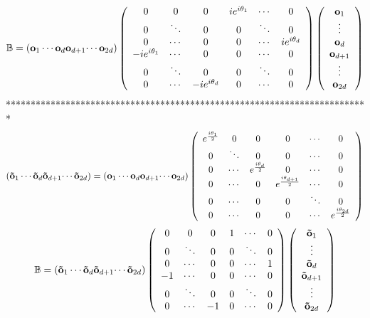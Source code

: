 \documentclass[aps,preprint]{revtex4}%
\begin{document}
\[
\mathbb{B}=\left(  \mathbf{o}_{1}\cdots\mathbf{o}_{d}\mathbf{o}_{d+1}%
\mathbf{\cdots o}_{2d}\right)  \left(
\begin{array}
[c]{cccccc}%
0 & 0 & 0 & ie^{i\theta_{1}} & \cdots & 0\\
0 & \ddots & 0 & 0 & \ddots & 0\\
0 & \cdots & 0 & 0 & \cdots & ie^{i\theta_{d}}\\
-ie^{i\theta_{1}} & \cdots & 0 & 0 & \cdots & 0\\
0 & \ddots & 0 & 0 & \ddots & 0\\
0 & \cdots & -ie^{i\theta_{d}} & 0 & \cdots & 0
\end{array}
\right)  \left(
\begin{array}
[c]{c}%
\mathbf{o}_{1}\\
\vdots\\
\mathbf{o}_{d}\\
\mathbf{o}_{d+1}\\
\vdots\\
\mathbf{o}_{2d}%
\end{array}
\right)
\]
*************************************************************************%
\[
\left(  \mathbf{\tilde{o}}_{1}\cdots\mathbf{\tilde{o}}_{d}\mathbf{\tilde{o}%
}_{d+1}\mathbf{\cdots\tilde{o}}_{2d}\right)  =\left(  \mathbf{o}_{1}%
\cdots\mathbf{o}_{d}\mathbf{o}_{d+1}\mathbf{\cdots o}_{2d}\right)  \left(
\begin{array}
[c]{cccccc}%
e^{\frac{i\theta_{1}}{2}} & 0 & 0 & 0 & \cdots & 0\\
0 & \ddots & 0 & 0 & \cdots & 0\\
0 & \cdots & e^{\frac{i\theta_{d}}{2}} & 0 & \cdots & 0\\
0 & \cdots & 0 & e^{\frac{i\theta_{d+1}}{2}} & \cdots & 0\\
0 & \cdots & 0 & 0 & \ddots & 0\\
0 & \cdots & 0 & 0 & \cdots & e^{\frac{i\theta_{2d}}{2}}%
\end{array}
\right)
\]%
\[
\mathbb{B}=\left(  \mathbf{\tilde{o}}_{1}\cdots\mathbf{\tilde{o}}%
_{d}\mathbf{\tilde{o}}_{d+1}\mathbf{\cdots\tilde{o}}_{2d}\right)  \left(
\begin{array}
[c]{cccccc}%
0 & 0 & 0 & 1 & \cdots & 0\\
0 & \ddots & 0 & 0 & \ddots & 0\\
0 & \cdots & 0 & 0 & \cdots & 1\\
-1 & \cdots & 0 & 0 & \cdots & 0\\
0 & \ddots & 0 & 0 & \ddots & 0\\
0 & \cdots & -1 & 0 & \cdots & 0
\end{array}
\right)  \left(
\begin{array}
[c]{c}%
\mathbf{\tilde{o}}_{1}\\
\vdots\\
\mathbf{\tilde{o}}_{d}\\
\mathbf{\tilde{o}}_{d+1}\\
\vdots\\
\mathbf{\tilde{o}}_{2d}%
\end{array}
\right)
\]
\end{document}
